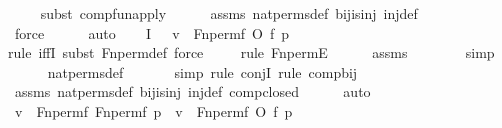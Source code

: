 \begin{isabellebody}
\ \ \ \ \isamarkupfalse%
{\isacharparenleft}{\kern0pt}subst\ comp{\isacharunderscore}{\kern0pt}fun{\isacharunderscore}{\kern0pt}apply{\isacharparenright}{\kern0pt}\isanewline
\ \ \ \ \isamarkupfalse%
\ assms\ nat{\isacharunderscore}{\kern0pt}perms{\isacharunderscore}{\kern0pt}def\ bij{\isacharunderscore}{\kern0pt}is{\isacharunderscore}{\kern0pt}inj\ inj{\isacharunderscore}{\kern0pt}def\ \isanewline
\ \ \ \ \ \ \isamarkupfalse%
\ force\isanewline
\ \ \ \ \isamarkupfalse%
\ auto\isanewline
\ \ \isamarkupfalse%
\ I{}{\isacharcolon}{\kern0pt}\ {\isachardoublequoteopen}{\isachardot}{\kern0pt}{\isachardot}{\kern0pt}{\isachardot}{\kern0pt}\ {\isasymlongleftrightarrow}\ v\ {\isasymin}\ Fn{\isacharunderscore}{\kern0pt}perm{\isacharparenleft}{\kern0pt}f{\isacharprime}{\kern0pt}\ O\ f{\isacharcomma}{\kern0pt}\ p{\isacharparenright}{\kern0pt}{\isachardoublequoteclose}\ \isanewline
\ \ \ \ \isamarkupfalse%
{\isacharparenleft}{\kern0pt}rule\ iffI{\isacharcomma}{\kern0pt}\ subst\ Fn{\isacharunderscore}{\kern0pt}perm{\isacharunderscore}{\kern0pt}def{\isacharcomma}{\kern0pt}\ force{\isacharparenright}{\kern0pt}\isanewline
\ \ \ \ \isamarkupfalse%
{\isacharparenleft}{\kern0pt}rule\ Fn{\isacharunderscore}{\kern0pt}permE{\isacharparenright}{\kern0pt}\isanewline
\ \ \ \ \isamarkupfalse%
\ assms\isanewline
\ \ \ \ \ \ \isamarkupfalse%
\ simp\isanewline
\ \ \ \ \isamarkupfalse%
\ nat{\isacharunderscore}{\kern0pt}perms{\isacharunderscore}{\kern0pt}def\isanewline
\ \ \ \ \ \isamarkupfalse%
\ {\isacharparenleft}{\kern0pt}simp{\isacharcomma}{\kern0pt}\ rule\ conjI{\isacharcomma}{\kern0pt}\ rule\ comp{\isacharunderscore}{\kern0pt}bij{\isacharparenright}{\kern0pt}\isanewline
\ \ \ \ \isamarkupfalse%
\ assms\ nat{\isacharunderscore}{\kern0pt}perms{\isacharunderscore}{\kern0pt}def\ bij{\isacharunderscore}{\kern0pt}is{\isacharunderscore}{\kern0pt}inj\ inj{\isacharunderscore}{\kern0pt}def\ comp{\isacharunderscore}{\kern0pt}closed\isanewline
\ \ \ \ \isamarkupfalse%
\ auto\isanewline
\ \ \isamarkupfalse%
\ {\isachardoublequoteopen}v\ {\isasymin}\ Fn{\isacharunderscore}{\kern0pt}perm{\isacharparenleft}{\kern0pt}f{\isacharprime}{\kern0pt}{\isacharcomma}{\kern0pt}\ Fn{\isacharunderscore}{\kern0pt}perm{\isacharparenleft}{\kern0pt}f{\isacharcomma}{\kern0pt}\ p{\isacharparenright}{\kern0pt}{\isacharparenright}{\kern0pt}\ {\isasymlongleftrightarrow}\ v\ {\isasymin}\ Fn{\isacharunderscore}{\kern0pt}perm{\isacharparenleft}{\kern0pt}f{\isacharprime}{\kern0pt}\ O\ f{\isacharcomma}{\kern0pt}\ p{\isacharparenright}{\kern0pt}{\isachardoublequoteclose}\ \isamarkupfalse%

\end{isabellebody}
